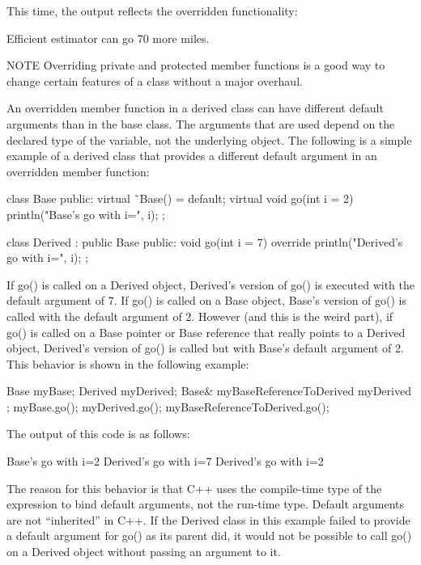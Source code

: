 This time, the output reflects the overridden functionality:

\begin{shell}
Efficient estimator can go 70 more miles.
\end{shell}

\begin{myNotic}{NOTE}
Overriding private and protected member functions is a good way to change certain features of a class without a major overhaul.
\end{myNotic}



An overridden member function in a derived class can have different default arguments than in the base class. The arguments that are used depend on the declared type of the variable, not the underlying object. The following is a simple example of a derived class that provides a different default argument in an overridden member function:

\begin{cpp}
class Base
{
    public:
        virtual ˜Base() = default;
        virtual void go(int i = 2) { println("Base's go with i={}", i); }
};

class Derived : public Base
{
    public:
        void go(int i = 7) override { println("Derived's go with i={}", i); }
};
\end{cpp}

If go() is called on a Derived object, Derived’s version of go() is executed with the default argument of 7. If go() is called on a Base object, Base’s version of go() is called with the default argument of 2. However (and this is the weird part), if go() is called on a Base pointer or Base reference that really points to a Derived object, Derived’s version of go() is called but with Base’s default argument of 2. This behavior is shown in the following example:

\begin{cpp}
Base myBase;
Derived myDerived;
Base& myBaseReferenceToDerived { myDerived };
myBase.go();
myDerived.go();
myBaseReferenceToDerived.go();
\end{cpp}

The output of this code is as follows:

\begin{shell}
Base's go with i=2
Derived's go with i=7
Derived's go with i=2
\end{shell}

The reason for this behavior is that C++ uses the compile-time type of the expression to bind default arguments, not the run-time type. Default arguments are not “inherited” in C++. If the Derived class in this example failed to provide a default argument for go() as its parent did, it would not be possible to call go() on a Derived object without passing an argument to it.

